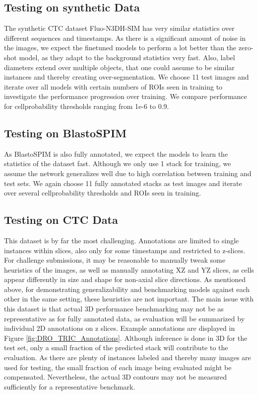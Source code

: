 \subsection{Testing on synthetic Data}

The synthetic CTC dataset Fluo-N3DH-SIM has very similar statistics over different sequences and timestamps. As there is a significant amount of noise in the images, we expect the finetuned models to perform a lot better than the zero-shot model, as they adapt to the background statistics very fast. Also, label diameters extend over multiple objects, that one could assume to be similar instances and thereby creating over-segmentation. We choose 11 test images and iterate over all models with certain numbers of ROIs seen in training to investigate the performance progression over training. We compare performance for cellprobability thresholds ranging from 1e-6 to 0.9.


\subsection{Testing on BlastoSPIM}

As BlastoSPIM is also fully annotated, we expect the models to learn the statistics of the dataset fast. Although we only use 1 stack for training, we assume the network generalizes well due to high correlation between training and test sets. We again choose 11 fully annotated stacks as test images and iterate over several cellprobability thresholds and ROIs seen in training. 


\subsection{Testing on CTC Data}

This dataset is by far the most challenging. Annotations are limited to single instances within slices, also only for some timestamps and restricted to z-slices. For challenge submissions, it may be reasonable to manually tweak some heuristics of the images, as well as manually annotating XZ and YZ slices,
as cells appear differently in size and shape for non-axial slice directions. As mentioned above, for demonstrating generalizability and benchmarking models against each other in the same setting, these heuristics are not important. 
The main issue with this dataset is that actual 3D performance benchmarking may not be as representative as for fully annotated data, as evaluation will be summarized by individual 2D annotations on z slices. Example annotations are displayed in Figure \ref{fig:DRO_TRIC_Annotations}. Although inference is done in 3D for the test set, only a small fraction of the predicted stack will contribute to the evaluation. As there are plenty of instances labeled and thereby many images are used for testing, the small fraction of each image being evaluated might be compensated. Nevertheless, the actual 3D contours may not be measured sufficiently for a representative benchmark.

